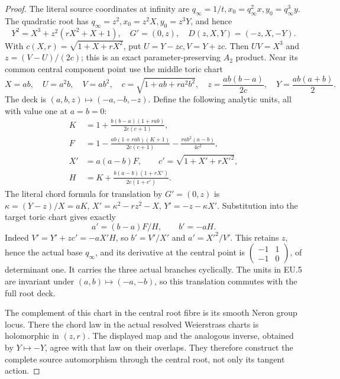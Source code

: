 \begin{proof}
\par\nobreak

The literal source coordinates at infinity are
\(q_\infty=1/t,x_0=q_\infty^2x,y_0=q_\infty^3y\). The quadratic
root has \(q_\infty=z^2,x_0=z^2X,y_0=z^3Y\), and hence
\[
 Y^2=X^3+z^2(rX^2+X+1),\quad G'=(0,z),\quad
 D(z,X,Y)=(-z,X,-Y).
\]
With \(c(X,r)=\sqrt{1+X+rX^2}\), put \(U=Y-zc,V=Y+zc\).
Then \(UV=X^3\) and \(z=(V-U)/(2c)\); this is an exact
parameter-preserving \(A_2\) product. Near its common central
component point use the middle toric chart
\[
 X=ab,\quad U=a^2b,\quad V=ab^2,\quad
 c=\sqrt{1+ab+ra^2b^2},\quad
 z=\frac{ab(b-a)}{2c},\quad Y=\frac{ab(a+b)}2.
 \tag{EU.4}
\]
The deck is \((a,b,z)\mapsto(-a,-b,-z)\). Define the following
analytic units, all with value one at \(a=b=0\):
\[
\begin{aligned}
 K&=1+\frac{b(b-a)(1+rab)}{2c(c+1)},\\
 F&=1-\frac{ab(1+rab)(K+1)}{2c(c+1)}
           -\frac{ra b^2(a-b)}{4c^2},\\
 X'&=a(a-b)F,\qquad c'=\sqrt{1+X'+rX'^2},\\
 H&=K+\frac{b(a-b)(1+rX')}{2c(1+c')}.
\end{aligned}
 \tag{EU.5}
\]
The literal chord formula for translation by \(G'=(0,z)\) is
\(\kappa=(Y-z)/X=aK\),
\(X'=\kappa^2-rz^2-X\), \(Y'=-z-\kappa X'\).
Substitution into the target toric chart gives exactly
\[
                 a'=(b-a)F/H,\qquad b'=-aH.
 \tag{EU.6}
\]
Indeed \(V'=Y'+zc'=-aX'H\), so \(b'=V'/X'\) and
\(a'=X'^2/V'\). This retains \(z\), hence the actual base
\(q_\infty\), and its derivative at the central point is
\(\left(\begin{smallmatrix}-1&1\\-1&0\end{smallmatrix}\right)\),
of determinant one. It carries the three actual branches cyclically.
The units in EU.5 are invariant under \((a,b)\mapsto(-a,-b)\), so
this translation commutes with the full root deck.

The complement of this chart in the central root fibre is its smooth
Neron group locus. There the chord law in the actual resolved
Weierstrass charts is holomorphic in \((z,r)\). The displayed map and
the analogous inverse, obtained by \(Y\mapsto-Y\), agree with that
law on their overlaps. They therefore construct the complete source
automorphism through the central root, not only its tangent action.


\end{proof}
